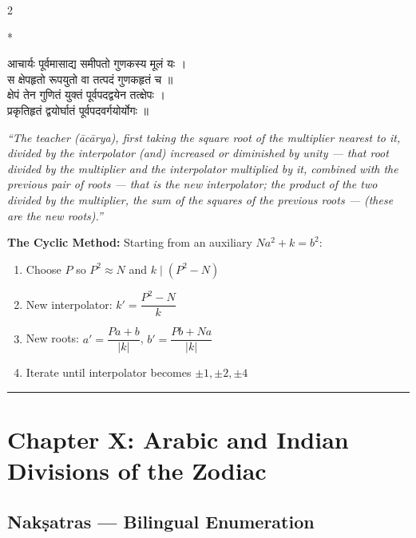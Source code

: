 \documentclass[11pt,a4paper]{article}
\newcommand{\longline}{\noindent\rule{\textwidth}{0.4pt}}
\newcommand{\dev}[1]{{\devanagarifont #1}}
\theoremstyle{definition}
\begin{document}
\begin{paracol}{2}

\switchcolumn[0]*\noindent
\begin{tcolorbox}[colback=sktbg,colframe=vertrule,boxrule=0.5pt,arc=3pt]
\dev{आचार्यः पूर्वमासाद्य समीपतो गुणकस्य मूलं यः ।\\
स क्षेपहृतो रूपयुतो वा तत्पदं गुणकहृतं च ॥}\\[0.3cm]
\dev{क्षेपं तेन गुणितं युक्तं पूर्वपदद्वयेन तत्क्षेपः ।\\
प्रकृतिहृतं द्वयोर्घातं पूर्वपदवर्गयोर्योगः ॥}
\end{tcolorbox}

\switchcolumn\noindent
\begin{tcolorbox}[colback=transbg,colframe=vertrule!60,boxrule=0.5pt,arc=3pt]
\textit{``The teacher (\=ac\=arya), first taking the square root of the multiplier nearest to it, divided by the interpolator (and) increased or diminished by unity --- that root divided by the multiplier and the interpolator multiplied by it, combined with the previous pair of roots --- that is the new interpolator; the product of the two divided by the multiplier, the sum of the squares of the previous roots --- (these are the new roots).''}

\textbf{The Cyclic Method:} Starting from an auxiliary $Na^2 + k = b^2$:
\begin{enumerate}
  \item Choose $P$ so $P^2 \approx N$ and $k \mid (P^2 - N)$
  \item New interpolator: $k' = \dfrac{P^2 - N}{k}$
  \item New roots: $a' = \dfrac{Pa + b}{|k|}$, $b' = \dfrac{Pb + Na}{|k|}$
  \item Iterate until interpolator becomes $\pm 1, \pm 2, \pm 4$
\end{enumerate}
\end{tcolorbox}

\end{paracol}

\longline

\section{Chapter X: Arabic and Indian Divisions of the Zodiac}
\label{sec:zodiac}

\subsection*{Nak\d{s}atras --- Bilingual Enumeration}
\end{document}
